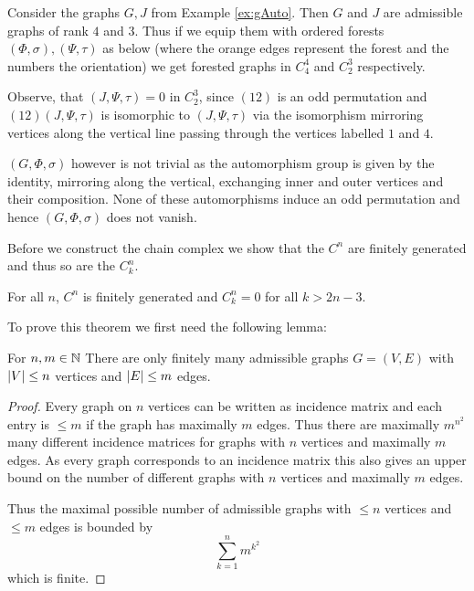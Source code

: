 \begin{eg}\label{ex:fg}
	Consider the graphs $G, J$ from Example \ref{ex:gAuto}. Then $G$ and $J$ are admissible graphs of rank $4$ and $3$. Thus if we equip them with ordered forests 
	$(\Phi,\sigma), (\Psi,\tau)$ as below 
	(where the orange edges represent the forest and the numbers the orientation) we get forested graphs in $C^{4}_{4}$ and $C^{3}_{2}$ respectively.


	Observe, that $(J,\Psi,\tau) = 0$ in $C_{2}^{3}$, since $ (1 2)$ is an odd permutation and  $(1 2) (J,\Psi,\tau)$ is isomorphic to $(J,\Psi,\tau)$ 
	via the isomorphism mirroring vertices along the vertical line passing through the vertices labelled $1$ and $4$.

	$(G,\Phi,\sigma)$ however is not trivial as the automorphism group is given by the identity,
	mirroring along the vertical, exchanging inner and outer vertices and their composition.
	None of these automorphisms induce an odd permutation and hence $(G,\Phi,\sigma)$ does not vanish.
\end{eg}

Before we construct the chain complex we show that the $C^{n}$ are finitely generated and thus so are the $C_{k}^{n}$.

\begin{theorem}\label{thm:finGenCn}
	For all $n$, $C^{n}$ is finitely generated and $C_{k}^{n} = 0$ for all $k > 2n-3$. 
\end{theorem}

To prove this theorem we first need the following lemma:
\begin{lemma}
	For $n,m \in \mathbb{N}$ There are only finitely many admissible graphs $G = (V,E)$ with $\abs{V} \leq n$ vertices and $ \abs{E} \leq m$ edges.
\end{lemma}

\begin{proof}
	Every graph on $n$ vertices can be written as incidence matrix and each entry is $\leq m$ if the graph has maximally $m$ edges. 
	Thus there are maximally $m^{n^2}$ many different incidence matrices for graphs with  $n$ vertices and maximally $m$ edges.
	As every graph corresponds to an incidence matrix this also gives an upper bound on the number of different graphs with $n$ vertices
	and maximally $m$ edges.

	Thus the maximal possible number of admissible graphs with $\leq n$ vertices and $\leq m$ edges is bounded by
	\[
		\sum_{k=1}^{n} m^{k^2} 
	\]
	which is finite.
\end{proof}

